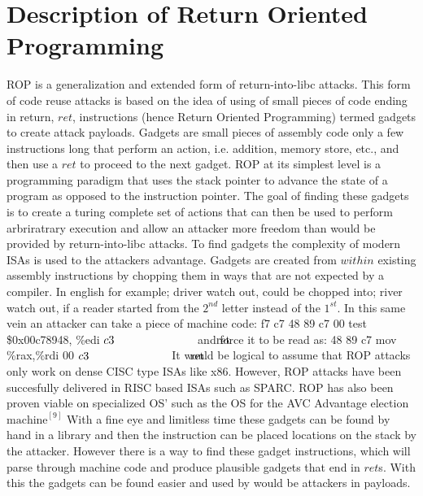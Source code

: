 \documentclass[11pt]{amsart}
\newcommand{\tab}[1]{\hspace{.2\textwidth}\rlap{#1}}
\begin{document}
\section*{Description of Return Oriented Programming}
ROP is a generalization and extended form of return-into-libc attacks. This form of code reuse attacks is based on the idea of using of small pieces of code ending in return, $ret$, instructions (hence Return Oriented Programming) termed gadgets to create attack payloads. Gadgets are small pieces of assembly code only a few instructions long that perform an action, i.e. addition, memory store, etc., and then use a $ret$ to proceed to the next gadget. ROP at its simplest level is a programming paradigm that uses the stack pointer to advance the state of a program as opposed to the instruction pointer. The goal of finding these gadgets is to create a turing complete set of actions that can then be used to perform arbriratrary execution and allow an attacker more freedom than would be provided by return-into-libc attacks. \newline \newline
To find gadgets the complexity of modern ISAs is used to the attackers advantage.  Gadgets are created from $within$ existing assembly instructions by chopping them in ways that are not expected by a compiler.  In english for example; driver watch out, could be chopped into; river watch out, if a reader started from the $2^{nd}$ letter instead of the $1^{st}$.  In this same vein an attacker can take a piece of machine code: \newline
\hspace*{10 mm} f7 c7 48 89 c7 00 \hspace*{10 mm} test \$0x00c78948, \%edi \newline
\hspace*{10 mm} $c3\tab{\hspace*{6 mm} ret}$ \newline 
and force it to be read as: \newline
\hspace*{10 mm} 48 89 c7 \hspace*{26 mm}mov \%rax,\%rdi \newline
\hspace*{10 mm} $00$ \newline
\hspace*{10 mm} $c3\tab{\hspace*{6 mm} ret}$  \newline \newline
It would be logical to assume that ROP attacks only work on dense CISC type ISAs like x86.  However, ROP attacks have been succesfully delivered in RISC based ISAs such as SPARC.  ROP has also been proven viable on specialized OS' such as the OS for the AVC Advantage election $\text{machine}^{[9]}$ \newline \newline
With a fine eye and limitless time these gadgets can be found by hand in a library and then the instruction can be placed locations on the stack by the attacker.  However there is a way to find these gadget instructions, which will parse through machine code and produce plausible gadgets that end in $ret$s.  With this the gadgets can be found easier and used by would be attackers in payloads.
\end{document}
